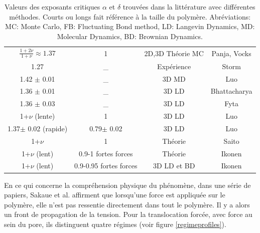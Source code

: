 \begin{table}
\begin{center}
\begin{tabular}{|c|c|c|c|}
  $\frac{1+2\nu}{1+\nu}\approx1.37$ & 1 & 2D,3D Théorie MC  & Panja, Vocks \cite{Panja22010,Vocks2008} \\
  1.27 & \_  & Expérience & Storm \cite{Storm2005} \\
  1.42 $\pm$ 0.01 & \_  & 3D MD & Luo \cite{Luo2008} \\
  1.36 $\pm$ 0.01 & \_  & 3D LD & Bhattacharya \cite{Bhattacharya2009} \\
 1.36 $\pm$ 0.03 & \_  & 3D LD & Fyta \cite{Fyta2008} \\
 1+$\nu$ (lente) & 1  & 3D LD & Luo \cite{Luo2009} \\
 1.37$\pm$ 0.02 (rapide) & 0.79$\pm$ 0.02  & 3D LD & Luo \cite{Luo2009} \\
 1+$\nu$ & 1  & Théorie & Saito \cite{Saito2012} \\
 1+$\nu$ (lent) & 0.9-1 fortes forces & Théorie & Ikonen \cite{Ikonen2012} \\
 1+$\nu$ (lent) & 0.9-0.95 fortes forces& 3D LD et BD & Ikonen \cite{Ikonen2012} \\
  
  \hline
\end{tabular}
\caption[Valeurs des exposants critiques]{Valeurs des exposants critiques $\alpha$ et $\delta$ trouvées dans la littérature avec différentes méthodes. Courts ou longs fait référence à la taille du polymère. Abréviations: MC: Monte Carlo, FB: Fluctuating
Bond method, LD: Langevin Dynamics, MD: Molecular Dynamics, BD: Brownian Dynamics.}
\label{tableautransloc}
\end{center}
\end{table}
 
 
 En ce qui concerne la compréhension physique du phénomène, dans une série de papiers, Sakaue et al. \cite{Sakaue2007,Sakaue2010,Saito2011,Saito2012,Sakaue2012} 
 affirment que lorsqu'une force est appliquée sur le polymère, elle n'est pas ressentie directement dans tout le polymère. Il y a alors un front de propagation de la tension. Pour la translocation forcée, avec force au sein du pore, ils distinguent quatre régimes (voir figure \ref{regimeprofiles}).
 
